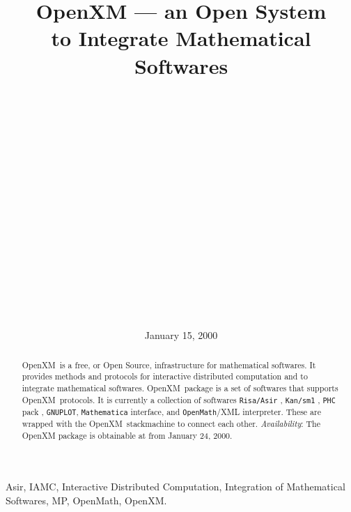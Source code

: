 \documentclass[submit]{acmconf}
\def\OpenXM{{\rm OpenXM\ }}
\begin{document}
\date{January 15, 2000}
\title{OpenXM 
      --- an Open System \\ to Integrate Mathematical Softwares}
\author{\\
         \\
         \\
         \and
         \\
         \\
         \and
         \\
         \\
         \and
         \\
         \\
         \and
         \\
         \\
         \and
         \\
         \\
       }
\maketitle

\begin{abstract}
\OpenXM is a free, or Open Source, infrastructure for mathematical
softwares.
It provides methods and protocols 
for interactive distributed computation and
to integrate mathematical softwares.
\OpenXM package is a set of softwares that supports \OpenXM protocols.
It is currently a collection of softwares
{\tt Risa/Asir} \cite{asir}, {\tt Kan/sm1} \cite{kan}, {\tt PHC} pack \cite{phc}, {\tt GNUPLOT},
{\tt Mathematica} interface, and
{\tt OpenMath}/XML \cite{OpenMath} interpreter.
These are wrapped with the \OpenXM stackmachine
to connect each other.
{\it Availability}: The OpenXM package is obtainable at \cite{openxm-web}
from January 24, 2000.
\end{abstract}

\begin{keywords}
Asir,
IAMC, Interactive Distributed Computation, 
Integration of Mathematical Softwares,
MP, OpenMath, OpenXM. 
\end{keywords}




















\end{document}

